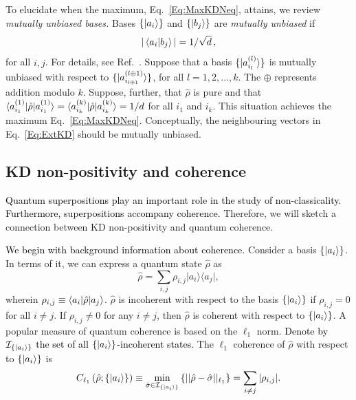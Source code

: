 \documentclass[%
 reprint,
superscriptaddress,
nofootinbib,
bibnotes,
 amsmath,amssymb,
 aps,
]{revtex4-1}
\theoremstyle{plain}
\newcommand*{\ketbra}[2]{\lvert #1 \rangle\!\langle #2 \rvert}
\newcommand{\nicole}[1]{\textcolor{black}{#1} }
\begin{document}
To elucidate when the maximum, Eq.~\eqref{Eq:MaxKDNeq}, attains, we review \emph{mutually unbiased bases.}
Bases $\{ \ket{a_i}\} $ and $ \{ \ket{b_j}\} $ are \emph{mutually unbiased} if 
\begin{equation}
\label{Eq:MutUnbias}
    |\braket{a_i|b_j}| = 1/\sqrt{d} \, ,
\end{equation}
for all $i,j$. For details, see Ref.~\cite{Durt10}.
Suppose that a basis $ \{  \ket{a^{(l)}_{i_l}} \} $
is mutually unbiased with respect to
$\{  \ket{a^{(l \oplus 1)}_{i_{l \oplus 1}}} \} $,
for all $l = 1, 2, \ldots, k$.
The $\oplus$ represents addition modulo $k$.
Suppose, further, that $\hat{\rho}$ is pure and that $ \braket{a^{(1)}_{i_1}|\hat{\rho}|a^{(1)}_{i_1}}  =  \braket{a^{(k)}_{i_k}|\hat{\rho}|a^{(k)}_{i_k}}  = 1/d $ for all $i_1$ and $i_k$.
This situation achieves the maximum Eq.~\eqref{Eq:MaxKDNeq}. 
Conceptually, the neighbouring vectors in Eq.~\eqref{Eq:ExtKD} should be mutually unbiased. 





\subsection{KD non-positivity and coherence}
\label{SubSec:KDCohere}


\nicole{Quantum superpositions play an important role in the study of non-classicality. Furthermore, superpositions accompany coherence.}
Therefore, we will sketch a connection between KD non-positivity and quantum coherence.

\nicole{We begin with background information about coherence.}
Consider a basis $\{ \ket{a_i} \}$.  In terms of it, we can express a quantum state $\hat{\rho}$ as 
\begin{equation}
\hat{\rho} = \sum_{i,j} \rho_{i,j} \ketbra{a_i}{a_j} ,
\end{equation}
wherein $\rho_{i,j} \equiv \braket{a_i | \hat{\rho}| a_j}$.  $\hat{\rho}$ is incoherent with respect to the basis $\{ \ket{a_i} \}$ if $\rho_{i,j}=0$ for all $i\neq j$.  If $\rho_{i,j}\neq 0$ for any $i \neq j$, then $\hat{\rho}$ is coherent with respect to $\{ \ket{a_i}\}$.  A popular measure of quantum coherence is based on the $\ell_1$ norm.  \nicole{Denote by $\mathcal{I}_{\{\ket{a_i}\}}$ the set of all $\{ \ket{a_i}\}$-incoherent states.  }  
The $\ell_1$ coherence  of $\hat{\rho}$ with respect to $\{ \ket{a_i} \}$ is
\begin{equation}
C_{\ell_1} \left( \hat{\rho}; \{ \ket{a_i} \}\right) 
\equiv \min_{\hat{\sigma} \in \mathcal{I}_{\{\ket{a_i}\}}} 
\left\{  || \hat{\rho} - \hat{\sigma}||_{\ell_1}  \right\} = \sum_{i\neq j} |\rho_{i,j}| .
\end{equation}
\end{document}
